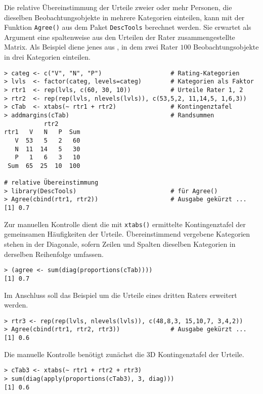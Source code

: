 Die relative Übereinstimmung der Urteile zweier oder mehr Personen, die dieselben Beobachtungsobjekte in mehrere Kategorien einteilen, kann mit der Funktion \lstinline!Agree()! aus dem Paket \lstinline!DescTools! berechnet werden. Sie erwartet als Argument eine spaltenweise aus den Urteilen der Rater zusammengestellte Matrix. Als Beispiel diene jenes aus , in dem zwei Rater $100$ Beobachtungsobjekte in drei Kategorien einteilen.
\begin{lstlisting}
> categ <- c("V", "N", "P")                   # Rating-Kategorien
> lvls  <- factor(categ, levels=categ)        # Kategorien als Faktor
> rtr1  <- rep(lvls, c(60, 30, 10))           # Urteile Rater 1, 2
> rtr2  <- rep(rep(lvls, nlevels(lvls)), c(53,5,2, 11,14,5, 1,6,3))
> cTab  <- xtabs(~ rtr1 + rtr2)               # Kontingenztafel
> addmargins(cTab)                            # Randsummen
           rtr2
rtr1   V   N   P  Sum
   V  53   5   2   60
   N  11  14   5   30
   P   1   6   3   10
 Sum  65  25  10  100

# relative Übereinstimmung
> library(DescTools)                          # für Agree()
> Agree(cbind(rtr1, rtr2))                    # Ausgabe gekürzt ...
[1] 0.7
\end{lstlisting}

Zur manuellen Kontrolle dient die mit \lstinline!xtabs()! ermittelte Kontingenztafel der gemeinsamen Häufigkeiten der Urteile. Übereinstimmend vergebene Kategorien stehen in der Diagonale, sofern Zeilen und Spalten dieselben Kategorien in derselben Reihenfolge umfassen.
\begin{lstlisting}
> (agree <- sum(diag(proportions(cTab))))
[1] 0.7
\end{lstlisting}

Im Anschluss soll das Beispiel um die Urteile eines dritten Raters erweitert werden.
\begin{lstlisting}
> rtr3 <- rep(rep(lvls, nlevels(lvls)), c(48,8,3, 15,10,7, 3,4,2))
> Agree(cbind(rtr1, rtr2, rtr3))              # Ausgabe gekürzt ...
[1] 0.6
\end{lstlisting}

Die manuelle Kontrolle benötigt zunächst die 3D Kontingenztafel der Urteile.
\begin{lstlisting}
> cTab3 <- xtabs(~ rtr1 + rtr2 + rtr3)
> sum(diag(apply(proportions(cTab3), 3, diag)))
[1] 0.6
\end{lstlisting}

